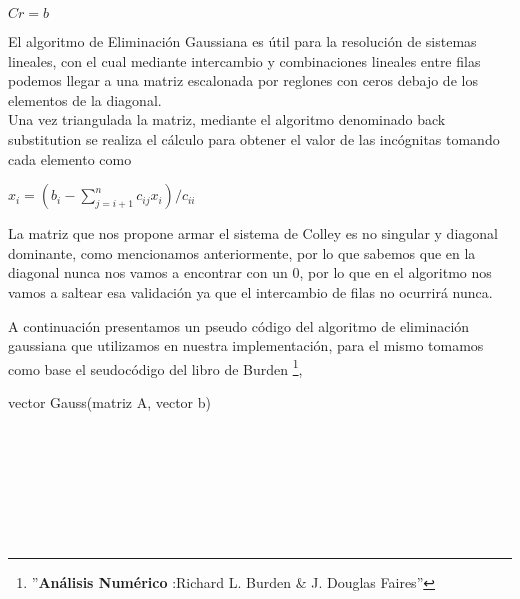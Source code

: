 \begin{center}
$Cr=b$
\end{center}

El algoritmo de Eliminación Gaussiana es útil para la resolución de sistemas lineales, con el cual mediante intercambio y combinaciones lineales entre filas podemos llegar a una matriz escalonada por reglones con ceros debajo de los elementos de la diagonal.\\
Una vez triangulada la matriz, mediante el algoritmo denominado back substitution se realiza el cálculo para obtener el valor de las incógnitas tomando cada elemento como\\

\begin{center}
$x_i = (b_i - \sum\limits_{j = i + 1}^n c_{ij}x_i) / c_{ii}$ \\
\end{center}

La matriz que nos propone armar el sistema de Colley es no singular y diagonal dominante, como mencionamos anteriormente, por lo que sabemos que en la diagonal nunca nos vamos a encontrar con un 0, por lo que en el algoritmo nos vamos a saltear esa validación ya que el intercambio de filas no ocurrirá nunca.

A continuación presentamos un pseudo código del algoritmo de eliminación gaussiana que utilizamos en nuestra implementación, para el mismo tomamos como base el seudocódigo del libro de Burden \footnote{''\textbf{Análisis Numérico }:Richard L. Burden & J. Douglas Faires''},

\begin{algorithm}
    \begin{algorithmic}[1]\parskip=2mm  
        \caption{vector Gauss(matriz A, vector b)}
        \\
        \\
        \\
        \\
        \\
        \\
    \end{algorithmic}
\end{algorithm}



